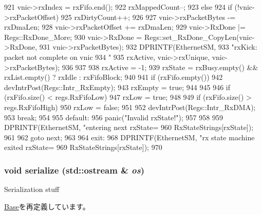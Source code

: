 \begin{DoxyCode}
{{{921             vnic->rxIndex = rxFifo.end();
922             rxMappedCount--;
923         } else {
924             if (!vnic->rxPacketOffset)
925                 rxDirtyCount++;
926 
927             vnic->rxPacketBytes -= rxDmaLen;
928             vnic->rxPacketOffset += rxDmaLen;
929             vnic->RxDone |= Regs::RxDone_More;
930             vnic->RxDone = Regs::set_RxDone_CopyLen(vnic->RxDone,
931                                                     vnic->rxPacketBytes);
932             DPRINTF(EthernetSM,
933                     "rxKick: packet not complete on vnic %
934                     "%
935                     rxActive, vnic->rxUnique, vnic->rxPacketBytes);
936         }
937 
938         rxActive = -1;
939         rxState = rxBusy.empty() && rxList.empty() ? rxIdle : rxFifoBlock;
940 
941         if (rxFifo.empty()) {
942             devIntrPost(Regs::Intr_RxEmpty);
943             rxEmpty = true;
944         }
945 
946         if (rxFifo.size() < regs.RxFifoLow)
947             rxLow = true;
948 
949         if (rxFifo.size() > regs.RxFifoHigh)
950             rxLow = false;
951 
952         devIntrPost(Regs::Intr_RxDMA);
953         break;
954 
955       default:
956         panic("Invalid rxState!");
957     }
958 
959     DPRINTF(EthernetSM, "entering next rxState=%
960             RxStateStrings[rxState]);
961 
962     goto next;
963 
964   exit:
968     DPRINTF(EthernetSM, "rx state machine exited rxState=%
969             RxStateStrings[rxState]);
970 }
\end{DoxyCode}
\hypertarget{classSinic_1_1Device_a53e036786d17361be4c7320d39c99b84}{
\subsubsection[{serialize}]{\setlength{\rightskip}{0pt plus 5cm}void serialize (std::ostream \& {\em os})}}
\label{classSinic_1_1Device_a53e036786d17361be4c7320d39c99b84}
Serialization stuff 

\hyperlink{classSinic_1_1Base_a53e036786d17361be4c7320d39c99b84}{Base}を再定義しています。



